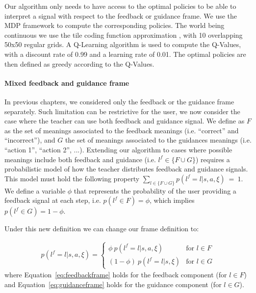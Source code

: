 Our algorithm only needs to have access to the optimal policies to be able to interpret a signal with respect to the feedback or guidance frame. We use the MDP framework to compute the corresponding policies. The world being continuous we use the tile coding function approximation \cite{sutton1998reinforcement}, with 10 overlapping 50x50 regular grids. A Q-Learning algorithm \cite{watkins1992q} is used to compute the Q-Values, with a discount rate of 0.99 and a learning rate of 0.01. The optimal policies are then defined as greedy according to the Q-Values.

\paragraph{Mixed feedback and guidance frame}

In previous chapters, we considered only the feedback or the guidance frame separately. Such limitation can be restrictive for the user, we  now consider the case where the teacher can use both feedback and guidance signal. We define as $F$ as the set of meanings associated to the feedback meanings (i.e. ``correct'' and ``incorrect''), and $G$ the set of meanings associated to the guidances meanings (i.e. ``action 1'', ``action 2'', ...). Extending our algorithm to cases where possible meanings include both feedback and guidance (i.e. $l^f \in \{F \cup G\}$) requires a probabilistic model of how the teacher distributes feedback and guidance signals. This model must hold the following property $\sum_{l \in \{F \cup G\}} p(l^f = l|s,a,\xi)~=~1$. We define a variable $\phi$ that represents the probability of the user providing a feedback signal at each step, i.e. $p(l^f \in F) = \phi$, which implies $p(l^f \in G) = 1 - \phi$.

Under this new definition we can change our frame definition to:

\begin{eqnarray}
    p(l^f = l|s,a,\xi) = 
        \begin{cases} 
            \phi~p(l^f = l|s,a,\xi) &\mbox{for } l \in F \\
            (1- \phi)~p(l^f = l|s,\xi) & \mbox{for } l \in G
        \end{cases}
        \label{eq:mixedfeedbackguidance}
\end{eqnarray}
where Equation~\ref{eq:feedbackframe} holds for the feedback component (for $l \in F$) and Equation~\ref{eq:guidanceframe} holds for the guidance component (for $l \in G$). 

